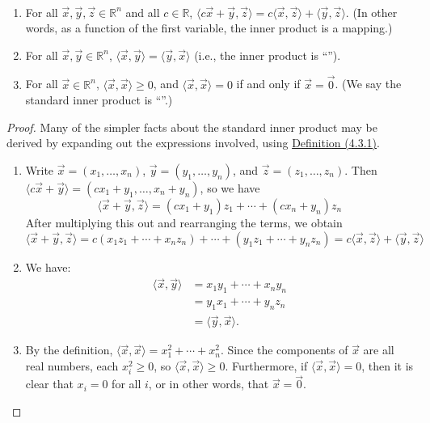 \documentclass[11pt,fleqn]{book} %
\begin{document}
\setcounter{chapter}{4}
\setcounter{dummy}{2}
\begin{proposition}
{~~~}

    \begin{enumerate}[label=\alph*)]
        \item For all $\vec{x}, \vec{y}, \vec{z} \in \mathbb{R}^n$ and all $c \in \mathbb{R}$, $\langle c\vec{x} + \vec{y}, \vec{z} \rangle = c \langle \vec{x}, \vec{z} \rangle + \langle \vec{y}, \vec{z} \rangle$. (In other words, as a function of the first variable, the inner product is a  mapping.)
        \item For all $\vec{x}, \vec{y} \in \mathbb{R}^n$, $\langle \vec{x}, \vec{y} \rangle = \langle \vec{y}, \vec{x} \rangle$ (i.e., the inner product is ``'').
        \item For all $\vec{x} \in \mathbb{R}^n$, $\langle \vec{x}, \vec{x} \rangle \ge 0$, and $\langle \vec{x}, \vec{x} \rangle = 0$ if and only if $\vec{x} = \vec{0}$. (We say the standard inner product is ``''.)
    \end{enumerate}
\end{proposition}
\setcounter{chapter}{3}

\begin{proof}
    Many of the simpler facts about the standard inner product may be derived by expanding out the expressions involved, using \hyperref[Def4_3_1]{Definition (4.3.1)}.
    
    \begin{enumerate}[label=\alph*)]
        \item Write $\vec{x} = (x_1, \dots, x_n)$, $\vec{y} = (y_1, \dots, y_n)$, and $\vec{z} = (z_1, \dots, z_n)$. Then $\langle c\vec{x} + \vec{y} \rangle = (cx_1 + y_1, \dots, x_n + y_n)$, so we have $$\langle \vec{x} + \vec{y}, \vec{z} \rangle = (cx_1 + y_1)z_1 + \cdots + (cx_n + y_n)z_n$$ After multiplying this out and rearranging the terms, we obtain $$\langle \vec{x} + \vec{y}, \vec{z} \rangle = c(x_1z_1 + \cdots + x_nz_n)+ \cdots + (y_1z_1+ \cdots + y_nz_n) = c \langle \vec{x}, \vec{z} \rangle + \langle \vec{y}, \vec{z} \rangle$$ 

        \item We have:
        \vspace{-0.45cm} 
        \begin{align*}
            \langle \vec{x}, \vec{y} \rangle 
            &= x_1y_1 + \cdots + x_ny_n 
            \\
            &= y_1x_1 + \cdots + y_nz_n
            \\
            &= \langle \vec{y}, \vec{x} \rangle.
        \end{align*}
        
        \item By the definition, $\langle \vec{x}, \vec{x} \rangle = x_1^2 + \cdots + x_n^2$. Since the components of $\vec{x}$ are all real numbers, each $x_i^2 \ge 0$, so $\langle \vec{x}, \vec{x} \rangle \ge 0$. Furthermore, if $\langle \vec{x}, \vec{x} \rangle = 0$, then it is clear that $x_i = 0$ for all $i$, or in other words, that $\vec{x} = \vec{0}$.
    \end{enumerate}
\end{proof}
\end{document}
